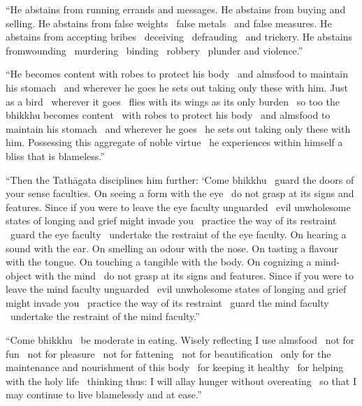 \begin{justify}
“He abstains from running errands and messages. He abstains from buying and selling. He abstains from false weights \breathmark\ false metals \breathmark\ and false measures. He abstains from accepting bribes \breathmark\ deceiving \breathmark\ defrauding \breathmark\ and trickery. He abstains fromwounding \breathmark\ murdering \breathmark\ binding \breathmark\ robbery \breathmark\ plunder and violence.”
\end{justify}

\begin{justify}
“He becomes content with robes to protect his body \breathmark\ and almsfood to maintain his stomach \breathmark\ and wherever he goes he sets out taking only these with him. Just as a bird \breathmark\ wherever it goes \breathmark\ flies with its wings as its only burden \breathmark\ so too the bhikkhu becomes content \breathmark\ with robes to protect his body \breathmark\ and almsfood to maintain his stomach \breathmark\ and wherever he goes \breathmark\ he sets out taking only these with him. Possessing this aggregate of noble virtue \breathmark\ he experiences within himself a bliss that is blameless.”
\end{justify}

\suttaRef{[MN 51]}

\begin{justify}
“Then the Tathāgata disciplines him further: ‘Come bhikkhu \breathmark\ guard the doors of your sense faculties. On seeing a form with the eye \breathmark\ do not grasp at its signs and features. Since if you were to leave the eye faculty unguarded \breathmark\ evil unwholesome states of longing and grief might invade you \breathmark\ practice the way of its restraint \breathmark\ guard the eye faculty \breathmark\ undertake the restraint of the eye faculty. On hearing a sound with the ear. On smelling an odour with the nose. On tasting a flavour with the tongue. On touching a tangible with the body. On cognizing a mind-object with the mind \breathmark\ do not grasp at its signs and features. Since if you were to leave the mind faculty unguarded \breathmark\ evil unwholesome states of longing and grief might invade you \breathmark\ practice the way of its restraint \breathmark\ guard the mind faculty \breathmark\ undertake the restraint of the mind faculty.”
\end{justify}

\begin{justify}
“Come bhikkhu \breathmark\ be moderate in eating. Wisely reflecting I use almsfood \breathmark\ not for fun \breathmark\ not for pleasure \breathmark\ not for fattening \breathmark\ not for beautification \breathmark\ only for the maintenance and nourishment of this body \breathmark\ for keeping it healthy \breathmark\ for helping with the holy life \breathmark\ thinking thus: I will allay hunger without overeating \breathmark\ so that I may continue to live blamelessly and at ease.”
\end{justify}

